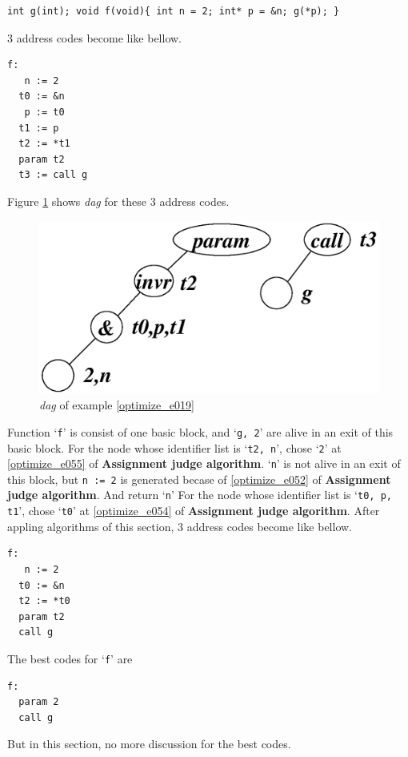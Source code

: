 \begin{Example}
\label{optimize_e019}
\begin{verbatim}
int g(int); void f(void){ int n = 2; int* p = &n; g(*p); }
\end{verbatim}
3 address codes become like bellow.
\begin{verbatim}
f:
   n := 2
  t0 := &n
   p := t0
  t1 := p
  t2 := *t1
  param t2
  t3 := call g
\end{verbatim}
Figure \ref{optimize_e020} shows {\em dag} for these 3 address codes.
\begin{figure}[htbp]
\begin{center}
\includegraphics[width=1.0\linewidth,height=0.507\linewidth]{opt008.eps}
\caption{{\em dag} of example \ref{optimize_e019}}
\label{optimize_e020}
\end{center}
\end{figure}
Function `{\tt{f}}' is consist of one basic block, and 
`{\tt{g, 2}}' are alive in an exit of this basic block.
For the node whose identifier list is `{\tt{t2, n}}',
chose `{\tt{2}}' at \ref{optimize_e055} of {\bf Assignment judge algorithm}.
`{\tt{n}}' is not alive in an exit of this block,
but {\tt{n := 2}} is generated becase of \ref{optimize_e052}
of {\bf Assignment judge algorithm}. And return `{\tt{n}}'
For the node whose identifier list is `{\tt{t0, p, t1}}',
chose `{\tt{t0}}' at \ref{optimize_e054} of {\bf Assignment judge algorithm}.
After appling algorithms of this section,
3 address codes become like bellow.
\begin{verbatim}
f:
   n := 2
  t0 := &n
  t2 := *t0
  param t2
  call g
\end{verbatim}
The best codes for `{\tt{f}}' are
\begin{verbatim}
f:
  param 2
  call g
\end{verbatim}
But in this section, no more discussion for the best codes.
\end{Example}

